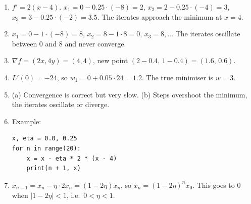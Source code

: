 \begin{enumerate}[label=\textbf{\ansnum.\arabic*}]
  \item $f'=2(x-4)$. $x_1=0-0.25\cdot(-8)=2$, $x_2=2-0.25\cdot(-4)=3$, $x_3=3-0.25\cdot(-2)=3.5$. The iterates approach the minimum at $x=4$.
  \item $x_1=0-1\cdot(-8)=8$, $x_2=8-1\cdot 8=0$, $x_3=8,\dots$ The iterates oscillate between $0$ and $8$ and never converge.
  \item $\nabla f=(2x,4y)=(4,4)$, new point $(2-0.4,\,1-0.4)=(1.6,\,0.6)$.
  \item $L'(0)=-24$, so $w_1=0+0.05\cdot 24=1.2$. The true minimiser is $w=3$.
  \item (a) Convergence is correct but very slow. (b) Steps overshoot the minimum, the iterates oscillate or diverge.
  \item[\textbf{8.6}] Example:
\begin{verbatim}
x, eta = 0.0, 0.25
for n in range(20):
    x = x - eta * 2 * (x - 4)
    print(n + 1, x)
\end{verbatim}
  \item[\textbf{8.7}] $x_{n+1}=x_n-\eta\cdot 2x_n=(1-2\eta)x_n$, so $x_n=(1-2\eta)^nx_0$. This goes to $0$ when $|1-2\eta|<1$, i.e.\ $0<\eta<1$.
\end{enumerate}
